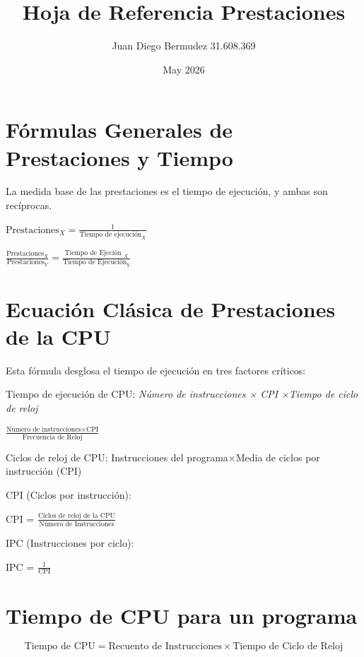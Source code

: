 \documentclass{article}
\title{\textbf{Hoja de Referencia Prestaciones}}
\author{Juan Diego Bermudez 31.608.369}
\date{May 2026}
\begin{document}
\maketitle

\section{Fórmulas Generales de Prestaciones y Tiempo}
La medida base de las prestaciones es el tiempo de ejecución, y ambas son recíprocas.

\begin{center}
$\text{Prestaciones}_X = \frac{1}{\text{Tiempo de ejecución}_X}$
\end{center}

\begin{center}
$\frac{\text{Prestaciones}_X}{\text{Prestaciones}_Y} = \frac{\text{Tiempo de Ejeción }_X}{\text{Tiempo de Ejecución}_Y}$
\end{center}

\section{Ecuación Clásica de Prestaciones de la CPU}
Esta fórmula desglosa el tiempo de ejecución en tres factores críticos:

Tiempo de ejecución de CPU: \textit{Número de instrucciones × CPI ×Tiempo de ciclo de reloj}

\begin{center}
$\frac{\text{Número de instrucciones×CPI}}{\text{Frecuencia de Reloj}}$
\end{center}

Ciclos de reloj de CPU: Instrucciones del programa×Media de ciclos por instrucción (CPI)

CPI (Ciclos por instrucción):
\begin{center}
CPI = $\frac{\text{Ciclos de reloj de la CPU}}{\text{Número de Instrucciones}}$
\end{center}
IPC (Instrucciones por ciclo): 
\begin{center}
IPC = $\frac{1}{\text{CPI}}$
\end{center}

\section{Tiempo de CPU para un programa}
$$\text{Tiempo de CPU} = \text{Recuento de Instrucciones} \times \text{Tiempo de Ciclo de Reloj}$$
\end{document}
